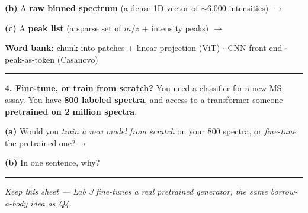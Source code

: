 \documentclass[11pt]{article}
\newif\ifsolution
\newcommand{\blk}[1]{\underline{\hspace{#1}}}
\newcommand{\rb}[2]{\ifsolution\textbf{#1}\else\blk{#2}\fi}
\newcommand{\keybox}[1]{\ifsolution\par\vspace{2pt}%
  \fbox{\parbox{0.965\textwidth}{\small\textbf{Answer.}\; #1}}\par\fi}
\newcommand{\work}[1]{\ifsolution\else\vspace{#1}\fi}
\begin{document}
\vspace{3pt}
\textbf{(b)} A \textbf{raw binned spectrum} (a dense 1D vector of $\sim$6{,}000 intensities)\hfill
$\rightarrow$\;\rb{CNN front-end}{5.2cm}

\vspace{3pt}
\textbf{(c)} A \textbf{peak list} (a sparse set of $m/z$ + intensity peaks)\hfill
$\rightarrow$\;\rb{peak-as-token (Casanovo)}{5.2cm}

\vspace{4pt}
\begin{center}
{\small \textbf{Word bank:}\;\; chunk into patches + linear projection (ViT) \;$\cdot$\;
CNN front-end \;$\cdot$\; peak-as-token (Casanovo)}
\end{center}

\keybox{(a) \textbf{Patches + linear projection (ViT-style)} --- a 2D image is cut into equal patches, each
projected to a token vector. (b) \textbf{CNN front-end} --- a dense, evenly-sampled 1D signal is best
condensed by a small 1D CNN that emits token embeddings (local peak-shape detection first, then the
transformer mixes globally). (c) \textbf{Peak-as-token} --- a sparse peak list is already a natural set of
tokens; each peak becomes one token carrying its $m/z$ and intensity, exactly how Casanovo reads a spectrum.}

\vspace{2pt}\hrule\vspace{5pt}

\textbf{4. Fine-tune, or train from scratch?}\; {\small You need a classifier for a new MS assay. You have
\textbf{800 labeled spectra}, and access to a transformer someone \textbf{pretrained on 2 million spectra}.}

\vspace{3pt}
\textbf{(a)} Would you \emph{train a new model from scratch} on your 800 spectra, or \emph{fine-tune} the
pretrained one?\hfill $\rightarrow$\;\rb{Fine-tune}{3.2cm}

\vspace{3pt}
\textbf{(b)} In one sentence, why?

\work{1.0cm}
\ifsolution\else\blk{\linewidth}\fi

\keybox{(a) \textbf{Fine-tune} --- freeze the pretrained body, bolt on a small new classification head, and
train mostly that head on the 800 labels (optionally unfreeze a little of the top with a much smaller
learning rate). (b) \textbf{800 labels are far too few to train a transformer's millions of weights from
scratch} --- it would overfit or collapse toward the majority class --- whereas \textbf{the pretrained body
already learned general spectral features from the 2 million spectra}, so you only need to fit a small head,
which 800 labels can do well. (Either reason earns full credit.)}

\vspace{4pt}\hrule\vspace{3pt}
{\small\itshape \ifsolution Answer key.\else Keep this sheet --- Lab 3 fine-tunes a real pretrained
generator, the same borrow-a-body idea as Q4.\fi}
\end{document}
